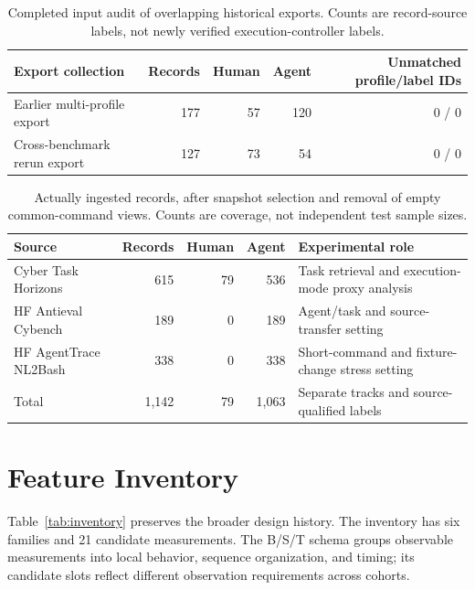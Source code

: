 \documentclass[10pt]{article}
\begin{document}
\begin{table}[htbp]
\centering
\caption{Completed input audit of overlapping historical exports. Counts are record-source labels, not newly verified execution-controller labels.}
\label{tab:audit}
\begin{tabular}{@{}lrrrr@{}}
\toprule
Export collection & Records & Human & Agent & Unmatched profile/label IDs \\
\midrule
Earlier multi-profile export & 177 & 57 & 120 & 0 / 0 \\
Cross-benchmark rerun export & 127 & 73 & 54 & 0 / 0 \\
\bottomrule
\end{tabular}
\end{table}


\begin{table}[htbp]
\centering
\caption{Actually ingested records, after snapshot selection and removal of empty common-command views. Counts are coverage, not independent test sample sizes.}
\label{tab:expanded}
\begin{tabularx}{\linewidth}{@{}YrrrY@{}}
\toprule
Source & Records & Human & Agent & Experimental role \\
\midrule
Cyber Task Horizons & 615 & 79 & 536 & Task retrieval and execution-mode proxy analysis \\
HF Antieval Cybench & 189 & 0 & 189 & Agent/task and source-transfer setting \\
HF AgentTrace NL2Bash & 338 & 0 & 338 & Short-command and fixture-change stress setting \\
\midrule
Total & 1,142 & 79 & 1,063 & Separate tracks and source-qualified labels \\
\bottomrule
\end{tabularx}
\end{table}

\section{Feature Inventory}
Table~\ref{tab:inventory} preserves the broader design history. The inventory has six families and 21 candidate measurements. The B/S/T schema groups observable measurements into local behavior, sequence organization, and timing; its candidate slots reflect different observation requirements across cohorts.
\end{document}
